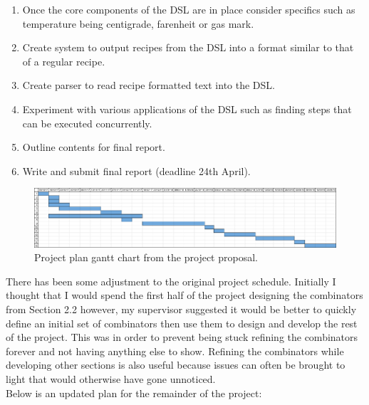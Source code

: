 \documentclass[11pt]{article}
\begin{document}
\begin{enumerate}
        \item Once the core components of the DSL are in place
        consider specifics such as temperature being centigrade,
        farenheit or gas mark.

        \item Create system to output recipes from the DSL into a format
        similar to that of a regular recipe.

        \item Create parser to read recipe formatted text into the DSL.

        \item Experiment with various applications of the DSL such
        as finding steps that can be executed concurrently.

        \item Outline contents for final report.

        \item Write and submit final report (deadline 24th April).

    \end{enumerate}

    \begin{figure}[ht]
        \centering
            \includegraphics[width=\textwidth,keepaspectratio]{gantt_chart.jpg}
        \caption{Project plan gantt chart from the project proposal.}
    \end{figure}

    There has been some adjustment to the original project schedule. Initially I thought that I would spend
    the first half of the project designing the combinators from Section 2.2 however, my supervisor suggested
    it would be better to quickly define an initial set of combinators then use them to design and develop the
    rest of the project. This was in order to prevent being stuck refining the combinators forever and not having
    anything else to show. Refining the combinators while developing other sections is also useful because issues
    can often be brought to light that would otherwise have gone unnoticed. \\

    Below is an updated plan for the remainder of the project:
\end{document}

